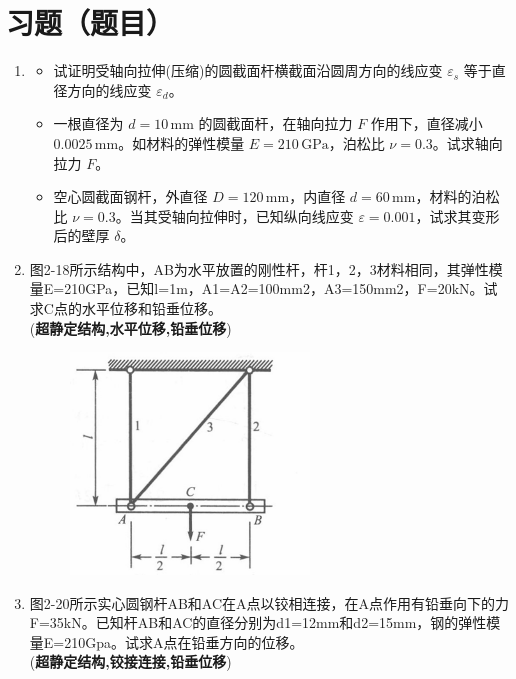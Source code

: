 \documentclass[12pt,a4paper]{article}
\newcounter{question}
\newenvironment{questions}{
    \setcounter{question}{0}
    \section*{习题（题目）}
    \begin{enumerate}[leftmargin=1.5em,label={\arabic*．}]
}{
    \end{enumerate}
}
\begin{document}
\begin{questions}
    \item \begin{itemize}
      \item 试证明受轴向拉伸(压缩)的圆截面杆横截面沿圆周方向的线应变 \(\varepsilon_s\) 等于直径方向的线应变 \(\varepsilon_d\)。

      \item 一根直径为 \(d = 10\, \text{mm}\) 的圆截面杆，在轴向拉力 \(F\) 作用下，直径减小 \(0.0025\, \text{mm}\)。如材料的弹性模量 \(E = 210\, \text{GPa}\)，泊松比 \(\nu = 0.3\)。试求轴向拉力 \(F\)。

      \item 空心圆截面钢杆，外直径 \(D = 120\, \text{mm}\)，内直径 \(d = 60\, \text{mm}\)，材料的泊松比 \(\nu = 0.3\)。当其受轴向拉伸时，已知纵向线应变 \(\varepsilon = 0.001\)，试求其变形后的壁厚 \(\delta\)。
    \end{itemize}

    \item 图2-18所示结构中，AB为水平放置的刚性杆，杆1，2，3材料相同，其弹性模量E=210GPa，已知l=1m，A1=A2=100mm2，A3=150mm2，F=20kN。试求C点的水平位移和铅垂位移。 \\ (\textbf{超静定结构,水平位移,铅垂位移})
    
    \begin{figure}[H]
        \centering
        \includegraphics[width=0.6\textwidth]{figures/15.png}
    \end{figure}

    \item 图2-20所示实心圆钢杆AB和AC在A点以铰相连接，在A点作用有铅垂向下的力F=35kN。已知杆AB和AC的直径分别为d1=12mm和d2=15mm，钢的弹性模量E=210Gpa。试求A点在铅垂方向的位移。 \\ (\textbf{超静定结构,铰接连接,铅垂位移})
    

\end{questions}
\end{document}

